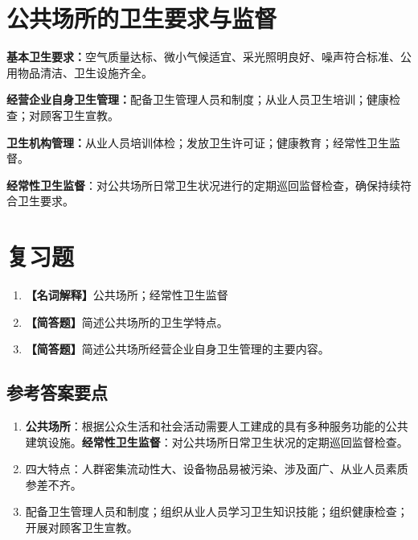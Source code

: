 \section{公共场所的卫生要求与监督}

\textbf{基本卫生要求：}空气质量达标、微小气候适宜、采光照明良好、噪声符合标准、公用物品清洁、卫生设施齐全。

\textbf{经营企业自身卫生管理：}配备卫生管理人员和制度；从业人员卫生培训；健康检查；对顾客卫生宣教。

\textbf{卫生机构管理：}从业人员培训体检；发放卫生许可证；健康教育；经常性卫生监督。

\begin{defbox}
\textbf{经常性卫生监督}：对公共场所日常卫生状况进行的定期巡回监督检查，确保持续符合卫生要求。
\end{defbox}

\section{复习题}

\begin{enumerate}[leftmargin=*, itemsep=8pt]
    \item \textbf{【名词解释】}公共场所；经常性卫生监督
    \item \textbf{【简答题】}简述公共场所的卫生学特点。
    \item \textbf{【简答题】}简述公共场所经营企业自身卫生管理的主要内容。
\end{enumerate}

\subsection*{参考答案要点}

\begin{enumerate}[leftmargin=*, itemsep=5pt]
    \item \textbf{公共场所}：根据公众生活和社会活动需要人工建成的具有多种服务功能的公共建筑设施。\textbf{经常性卫生监督}：对公共场所日常卫生状况的定期巡回监督检查。

    \item 四大特点：人群密集流动性大、设备物品易被污染、涉及面广、从业人员素质参差不齐。

    \item 配备卫生管理人员和制度；组织从业人员学习卫生知识技能；组织健康检查；开展对顾客卫生宣教。
\end{enumerate}

\newpage

\newpage